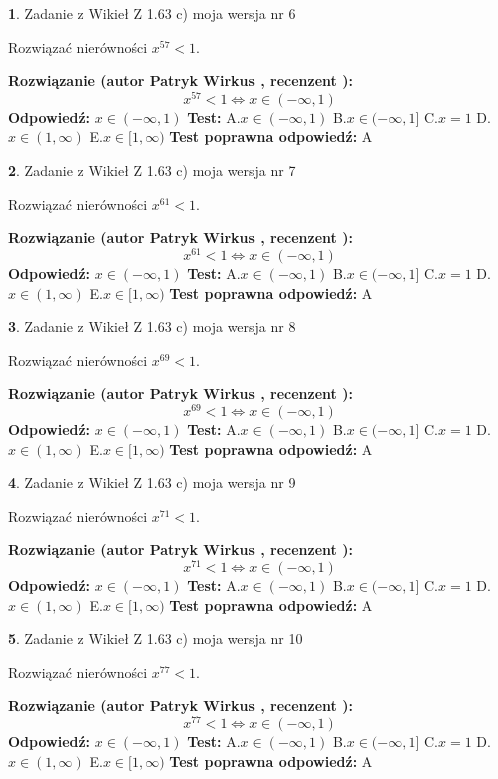 \documentclass[12pt, a4paper]{article}
\theoremstyle{definition} %
\newtheorem{zad}{}
\newcommand{\zadStart}[1]{\begin{zad}#1\newline}
\newcommand{\zadStop}{\end{zad}}
\newcommand{\rozwStart}[2]{\noindent \textbf{Rozwiązanie (autor #1 , recenzent #2): }\newline}
\newcommand{\rozwStop}{\newline}
\newcommand{\odpStart}{\noindent \textbf{Odpowiedź:}\newline}
\newcommand{\odpStop}{\newline}
\newcommand{\testStart}{\noindent \textbf{Test:}\newline}
\newcommand{\testStop}{\newline}
\newcommand{\kluczStart}{\noindent \textbf{Test poprawna odpowiedź:}\newline}
\newcommand{\kluczStop}{\newline}
\begin{document}
\zadStart{Zadanie z Wikieł Z 1.63 c) moja wersja nr 6}

Rozwiązać nierówności $x^{57} < 1$.
\zadStop
\rozwStart{Patryk Wirkus}{}
$$x^{57} < 1 \iff x \in (-\infty,1)$$
\rozwStop
\odpStart
$x \in (-\infty,1)$
\odpStop
\testStart
A.$x \in (-\infty,1)$ B.$x \in (-\infty,1]$ C.$x = 1$ D.$x \in (1,\infty)$ E.$x \in [1,\infty)$
\testStop
\kluczStart
A
\kluczStop



\zadStart{Zadanie z Wikieł Z 1.63 c) moja wersja nr 7}

Rozwiązać nierówności $x^{61} < 1$.
\zadStop
\rozwStart{Patryk Wirkus}{}
$$x^{61} < 1 \iff x \in (-\infty,1)$$
\rozwStop
\odpStart
$x \in (-\infty,1)$
\odpStop
\testStart
A.$x \in (-\infty,1)$ B.$x \in (-\infty,1]$ C.$x = 1$ D.$x \in (1,\infty)$ E.$x \in [1,\infty)$
\testStop
\kluczStart
A
\kluczStop



\zadStart{Zadanie z Wikieł Z 1.63 c) moja wersja nr 8}

Rozwiązać nierówności $x^{69} < 1$.
\zadStop
\rozwStart{Patryk Wirkus}{}
$$x^{69} < 1 \iff x \in (-\infty,1)$$
\rozwStop
\odpStart
$x \in (-\infty,1)$
\odpStop
\testStart
A.$x \in (-\infty,1)$ B.$x \in (-\infty,1]$ C.$x = 1$ D.$x \in (1,\infty)$ E.$x \in [1,\infty)$
\testStop
\kluczStart
A
\kluczStop



\zadStart{Zadanie z Wikieł Z 1.63 c) moja wersja nr 9}

Rozwiązać nierówności $x^{71} < 1$.
\zadStop
\rozwStart{Patryk Wirkus}{}
$$x^{71} < 1 \iff x \in (-\infty,1)$$
\rozwStop
\odpStart
$x \in (-\infty,1)$
\odpStop
\testStart
A.$x \in (-\infty,1)$ B.$x \in (-\infty,1]$ C.$x = 1$ D.$x \in (1,\infty)$ E.$x \in [1,\infty)$
\testStop
\kluczStart
A
\kluczStop



\zadStart{Zadanie z Wikieł Z 1.63 c) moja wersja nr 10}

Rozwiązać nierówności $x^{77} < 1$.
\zadStop
\rozwStart{Patryk Wirkus}{}
$$x^{77} < 1 \iff x \in (-\infty,1)$$
\rozwStop
\odpStart
$x \in (-\infty,1)$
\odpStop
\testStart
A.$x \in (-\infty,1)$ B.$x \in (-\infty,1]$ C.$x = 1$ D.$x \in (1,\infty)$ E.$x \in [1,\infty)$
\testStop
\kluczStart
A
\kluczStop
\end{document}
